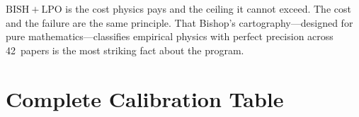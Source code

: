 \documentclass[11pt,a4paper]{report}
\theoremstyle{plain}
\theoremstyle{definition}
\theoremstyle{remark}
\newcommand{\BISH}{\mathrm{BISH}}
\newcommand{\LPO}{\mathrm{LPO}}
\begin{document}
\begin{chapterbox}
$\BISH+\LPO$ is the cost physics pays and the ceiling it cannot exceed. The cost and the failure are the same principle. That Bishop's cartography---designed for pure mathematics---classifies empirical physics with perfect precision across 42~papers is the most striking fact about the program.
\end{chapterbox}

\appendix

\chapter{Complete Calibration Table}
\end{document}
